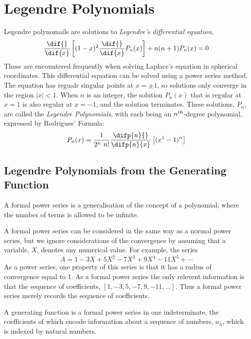 \section{Legendre Polynomials}
\label{sec:legendre}

Legendre polynomails are solutions to {\em Legendre's differential
  equation},
\begin{equation}
  \label{eq:legendrede}
  \frac{\dif{}}{\dif{x}} \left[ (1-x)^2 \frac{\dif{}}{\dif{x}} P_n(x) \right] + n(n+1) P_n(x) = 0
\end{equation}
These are encountered frequently when solving Laplace's equation in
spherical coordinates. This differential equation can be solved using
a power series method. The equation has regualr singular points at
$x=\pm 1$, so solutions only converge in the region $|x|<1$. When $n$
is an integer, the solution $P_n(x)$ that is regular at $x=1$ is also
regular at $x=-1$, and the solution terminates. These solutions,
$P_n$, are called the {\em Legendre Polynomials}, with each being an
$n^{\rm th}$-degree polynomial, expressed by Rodrigues' Formula:
\begin{equation}
  \label{eq:rodrigues}
  P_n(x) = \frac{1}{2^n\ n!} \frac{\difp{n}{}}{\difp{n}{x}} \left[ (x^1-1)^n \right]
\end{equation}

\subsection{Legendre Polynomials from the Generating Function}
\label{sec:generatinglegendre}

\begin{definition}
  A formal power series is a generalisation of the concept of a
  polynomial, where the number of terms is allowed to be infinite.
\end{definition}
A formal power series can be considered in the same way as a normal
power series, but we ignore considerations of the convergence by
assuming that a variable, $X$, denotes any numerical value. For
example, the series
\[ A = 1 - 3X+ 5X^2 - 7X^3 + 9X^4 - 11X^5 + \cdots \] As a power
series, one property of this series is that it has a radius of
convergence equal to 1. As a formal power series the only relevent
information is that the sequence of coefficients, $[1, -3, 5, -7, 9,
-11, \dots]$. Thus a formal power series merely records the sequence
of coefficients.

\begin{definition}
  A generating function is a formal power series in one indeterminate,
  the coefficients of which encode information about a sequence of
  numbers, $a_n$, which is indexed by natural numbers.
\end{definition}

